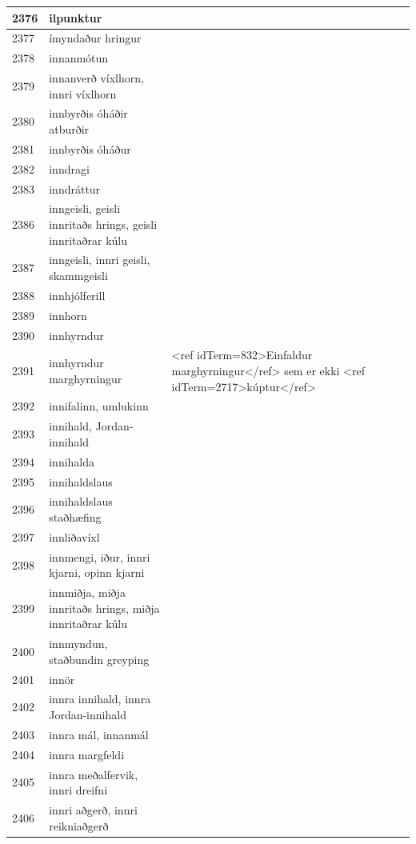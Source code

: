 \begin{longtable}{p{}|p{}|p{}|p{}|p{}}
\hline
2376 & ilpunktur &  &  &  \\
\hline
2377 & ímyndaður hringur &  &  &  \\
\hline
2378 & innanmótun &  &  &  \\
\hline
2379 & innanverð víxlhorn, innri víxlhorn &  &  &  \\
\hline
2380 & innbyrðis óháðir atburðir &  &  &  \\
\hline
2381 & innbyrðis óháður &  &  &  \\
\hline
2382 & inndragi &  &  &  \\
\hline
2383 & inndráttur &  &  &  \\
\hline
2386 & inngeisli, geisli innritaðs hrings, geisli innritaðrar kúlu &  &  &  \\
\hline
2387 & inngeisli, innri geisli, skammgeisli &  &  &  \\
\hline
2388 & innhjólferill &  &  &  \\
\hline
2389 & innhorn &  &  &  \\
\hline
2390 & innhyrndur & &  &  \\
\hline
2391 & innhyrndur marghyrningur & <ref idTerm=832>Einfaldur marghyrningur</ref> sem er ekki <ref idTerm=2717>kúptur</ref> &  &  \\
\hline
2392 & innifalinn, umlukinn &  &  &  \\
\hline
2393 & innihald, Jordan-innihald &  &  &  \\
\hline
2394 & innihalda &  &  &  \\
\hline
2395 & innihaldslaus &  &  &  \\
\hline
2396 & innihaldslaus staðhæfing &  &  &  \\
\hline
2397 & innliðavíxl &  &  &  \\
\hline
2398 & innmengi, iður, innri kjarni, opinn kjarni &  &  &  \\
\hline
2399 & innmiðja, miðja innritaðs hrings, miðja innritaðrar kúlu &  &  &  \\
\hline
2400 & innmyndun, staðbundin greyping &  &  &  \\
\hline
2401 & innör &  &  &  \\
\hline
2402 & innra innihald, innra Jordan-innihald &  &  &  \\
\hline
2403 & innra mál, innanmál &  &  &  \\
\hline
2404 & innra margfeldi &  &  &  \\
\hline
2405 & innra meðalfervik, innri dreifni &  &  &  \\
\hline
2406 & innri aðgerð, innri reikniaðgerð &  &  &  \\

\end{longtable}

